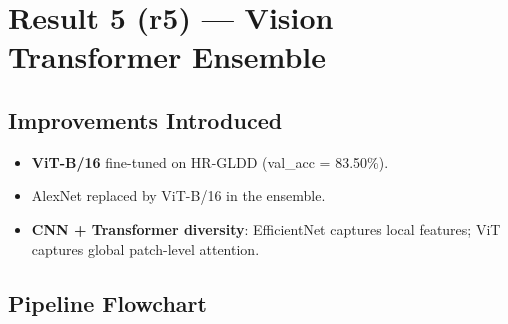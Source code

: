 \documentclass[12pt,a4paper]{article}
\begin{document}
\newpage
\section{Result 5 (r5) --- Vision Transformer Ensemble}

\subsection{Improvements Introduced}
\begin{itemize}[nosep]
  \item \colorbox{newbox}{\textbf{ViT-B/16}} fine-tuned on HR-GLDD (val\_acc = 83.50\%).
  \item AlexNet replaced by ViT-B/16 in the ensemble.
  \item \colorbox{newbox}{\textbf{CNN + Transformer diversity}}: EfficientNet captures local features;
        ViT captures global patch-level attention.
\end{itemize}

\subsection{Pipeline Flowchart}
\end{document}
